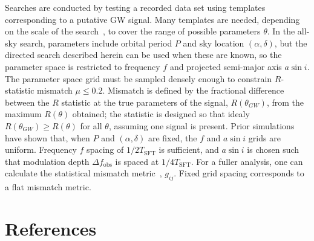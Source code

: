 \documentclass[12pt]{iopart}
\begin{document}
Searches are conducted by testing a recorded data set using templates corresponding to a putative GW signal.
Many templates are needed, depending on the scale of the search~\cite{GoetzTwoSpectMethods2011}, to cover the range of possible parameters $\theta$.
In the all-sky search, parameters include orbital period $P$ and sky location $(\alpha, \delta)$, but the directed search described herein can be used when these are known, so the parameter space is restricted to frequency $f$ and projected semi-major axis $a \sin i$.
The parameter space grid must be sampled densely enough to constrain $R$-statistic mismatch $\mu \leq 0.2$.
Mismatch is defined by the fractional difference between the $R$ statistic at the true parameters of the signal, $R(\theta_{GW})$, from the maximum $R(\theta)$ obtained; the statistic is designed so that idealy $R(\theta_{GW}) \geq R(\theta)$ for all $\theta$, assuming one signal is present.
Prior simulations have shown that, when $P$ and $(\alpha,\delta)$ are fixed, the $f$ and $a \sin i$ grids are uniform.
Frequency $f$ spacing of $1/2T_\mathrm{SFT}$ is sufficient, and $a \sin i$ is chosen such that modulation depth $\Delta f_\mathrm{obs}$ is spaced at $1/4T_\mathrm{SFT}$.
For a fuller analysis, one can calculate the statistical mismatch metric~\cite{Brady1998}, $g_{ij}$.
Fixed grid spacing corresponds to a flat mismatch metric.

\section*{References}



%
\end{document}
